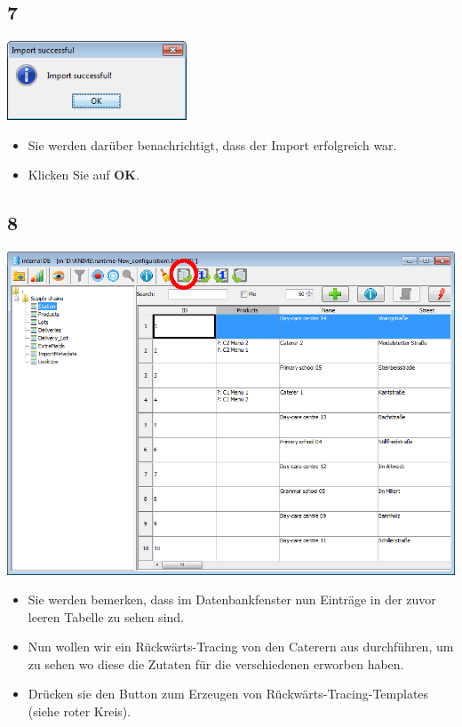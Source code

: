 \documentclass{beamer}
\begin{document}
\subsection{7}
\begin{frame}
	\begin{center}
  		\includegraphics[width=0.4\textwidth]{7.png}
	\end{center}
	\begin{itemize}
		\item Sie werden darüber benachrichtigt, dass der Import erfolgreich war.
		\item Klicken Sie auf \textbf{OK}.
	\end{itemize}
\end{frame}

\subsection{8}
\begin{frame}
	\begin{center}
  		\includegraphics[height=0.5\textheight]{8.png}
	\end{center}
	\begin{itemize}
		\item Sie werden bemerken, dass im Datenbankfenster nun Einträge in der zuvor leeren Tabelle zu sehen sind.
		\item Nun wollen wir ein Rückwärts-Tracing von den Caterern aus durchführen, um zu sehen wo diese die Zutaten für die verschiedenen erworben haben.
		\item Drücken sie den Button zum Erzeugen von Rückwärts-Tracing-Templates (siehe roter Kreis).
	\end{itemize}
\end{frame}
\end{document}
